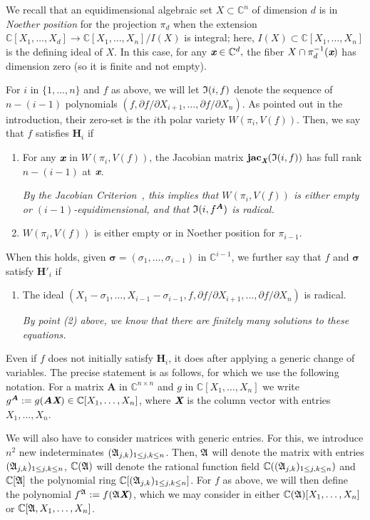 \documentclass[sigconf]{acmart}
\def\Xb{\textit{\textbf{X}}}
\def\mA{{\bm A}}
\def\xb{\textit{\textbf{x}}}
\def\C{\mathbb{C}}
\def\jac{ \textbf{jac}}
\def\pa{\partial}
\def\I{\frak{I}}
\def\A{\frak{A}}
\begin{document}
We recall that an equidimensional algebraic set $X \subset \C^n$ of
dimension $d$ is in \textit{Noether position} for the projection
$\pi_d$ when the extension $\C[X_1,\hdots,X_d] \rightarrow
\C[X_1,\hdots,X_n]/I(X)$ is integral; here, $I(X) \subset
\C[X_1,\dots,X_n]$ is the defining ideal of $X$. In this case, for any
$\xb \in \C^d,$ the fiber $X \cap \pi_d^{-1}(\xb)$ has dimension zero
(so it is finite and not empty).

For $i$ in $\{1,\dots,n\}$ and $f$ as above, we will let $\I(i, f)$
denote the sequence of $n-(i-1)$ polynomials $(f, {\pa f}/{\pa
  X_{i+1}},\dots,{\pa f}/{\pa X_n})$. As pointed out in the
introduction, their zero-set is the $i$th polar variety
$W(\pi_i,V(f))$.  Then, we say that $f$ satisfies $\textbf{H}_i$ if
\begin{enumerate}
\item For any $\xb$ in $W(\pi_i,V(f))$, the Jacobian matrix
  $\jac_\Xb(\I(i, f))$ has full rank $n-(i-1)$ at $\xb$.

  {\em By the Jacobian Criterion~\cite[Corollary 16.20]{ECA}, this
  implies that $W(\pi_i,V(f))$ is either empty or $(i-1)$-equidimensional,
  and that $\I(i, f^\mA)$ is radical.}

\smallskip

\item $W(\pi_i,V(f))$ is either empty or in Noether position for
  $\pi_{i-1}$.
\end{enumerate}
When this holds, given $\bm \sigma = (\sigma_1,\hdots,\sigma_{i-1})$
in $\C^{i-1}$, we further say that $f$ and $\bm \sigma$ satisfy
$\textbf{H}'_i$ if
\begin{enumerate}
\item The ideal  $(X_1-\sigma_1,\dots,X_{i-1}-\sigma_{i-1},f, {\pa f}/{\pa
  X_{i+1}},\dots,{\pa f}/{\pa X_n})$ is
  radical.

  {\em By point (2) above, we know that there are finitely many solutions 
    to these equations.}
\end{enumerate}

Even if $f$ does not initially satisfy $\textbf{H}_i$, it does after applying a generic change of variables. The precise
statement is as follows, for which we use the following
notation. For a matrix $\mA$ in $\C^{n\times n}$ and $g$ in
$\C[X_1,\hdots,X_n]$ we write $g^\mA:=g(\mA \Xb) \in
\C[X_1,\dots,X_n]$, where $\Xb$ is the column vector with entries
$X_1,\dots,X_n$.

We will also have to consider matrices with generic entries. For this,
we introduce $n^2$ new indeterminates $(\frak A_{j,k})_{1\le j,k \le
  n}$. Then, $\A$ will denote the matrix with entries $(\frak
A_{j,k})_{1\le j,k \le n}$, $\C(\A)$ will denote the rational function
field $\C((\frak A_{j,k})_{1\le j,k \le n})$ and $\C[\A]$ the
polynomial ring $\C[(\frak A_{j,k})_{1\le j,k \le n}]$.  For $f$ as
above, we will then define the polynomial $f^\A:=f(\A \Xb)$, 
which we may consider in either
$\C(\A)[X_1,\dots,X_n]$ or $\C[\A,X_1,\dots,X_n]$.
\end{document}

